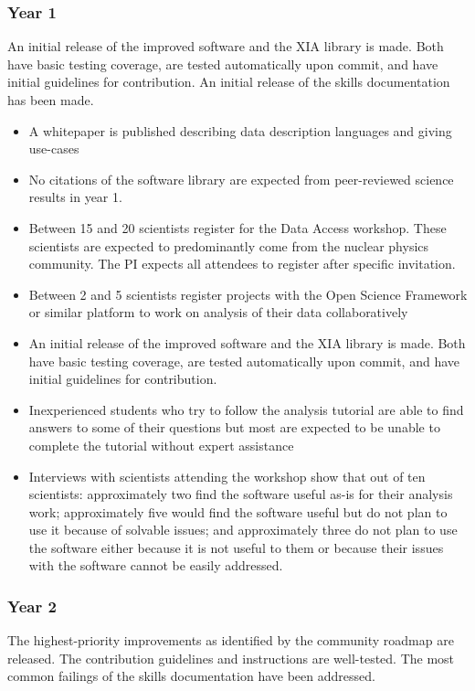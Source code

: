 \subsubsection*{Year 1}
An initial release of the improved software and the XIA library is made.  Both have basic testing coverage, are tested automatically upon commit, and have initial guidelines for contribution.  An initial release of the skills documentation has been made.
\begin{itemize}
  \item A whitepaper is published describing data description languages and giving use-cases
  \item No citations of the software library are expected from peer-reviewed science results in year 1.
  \item Between 15 and 20 scientists register for the Data Access workshop.  These scientists are expected to predominantly come from the nuclear physics community.  The PI expects all attendees to register after specific invitation.
  \item Between 2 and 5 scientists register projects with the Open Science Framework or similar platform to work on analysis of their data collaboratively
  \item An initial release of the improved software and the XIA library is made.  Both have basic testing coverage, are tested automatically upon commit, and have initial guidelines for contribution.
  \item Inexperienced students who try to follow the analysis tutorial are able to find answers to some of their questions but most are expected to be unable to complete the tutorial without expert assistance
  \item Interviews with scientists attending the workshop show that out of ten scientists: approximately two find the software useful as-is for their analysis work; approximately five would find the software useful but do not plan to use it because of solvable issues; and approximately three do not plan to use the software either because it is not useful to them or because their issues with the software cannot be easily addressed.
\end{itemize}

\subsubsection*{Year 2}
The highest-priority improvements as identified by the community roadmap are released.  The contribution guidelines and instructions are well-tested.   The most common failings of the skills documentation have been addressed. 


